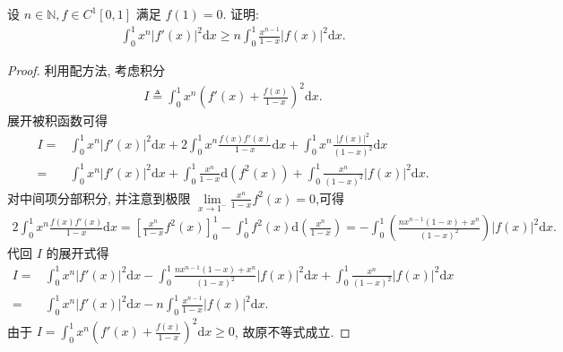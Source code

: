 \documentclass[../../main.tex]{subfiles}%
\begin{document}
\begin{example}
设 \(n \in \mathbb{N}, f \in C^1[0,1]\) 满足 \(f(1) = 0\). 证明:
\begin{align*}
\int_0^1 x^n |f'(x)|^2 \mathrm{d}x \geqslant n \int_0^1 \frac{x^{n-1}}{1-x} |f(x)|^2 \mathrm{d}x.
\end{align*}
\end{example}
\begin{proof}
利用配方法, 考虑积分
\begin{align*}
I \triangleq \int_0^1 x^n \left( f'(x) + \frac{f(x)}{1-x} \right)^2 \mathrm{d}x.
\end{align*}
展开被积函数可得
\begin{align*}
I = & \int_0^1 x^n |f'(x)|^2 \mathrm{d}x + 2 \int_0^1 x^n \frac{f(x)f'(x)}{1-x} \mathrm{d}x + \int_0^1 x^n \frac{|f(x)|^2}{(1-x)^2} \mathrm{d}x \\
= {} & \int_0^1 x^n |f'(x)|^2 \mathrm{d}x + \int_0^1 \frac{x^n}{1-x} \mathrm{d}(f^2(x)) + \int_0^1 \frac{x^n}{(1-x)^2} |f(x)|^2 \mathrm{d}x.
\end{align*}
对中间项分部积分, 并注意到极限 \(\lim\limits_{x \to 1^-} \frac{x^n}{1-x} f^2(x) = 0\),可得
\begin{align*}
2 \int_0^1 x^n \frac{f(x)f'(x)}{1-x} \mathrm{d}x= \left[ \frac{x^n}{1-x} f^2(x) \right]_0^1 - \int_0^1 f^2(x) \mathrm{d}\left( \frac{x^n}{1-x} \right) 
= - \int_0^1 \left( \frac{n x^{n-1}(1-x) + x^n}{(1-x)^2} \right) |f(x)|^2 \mathrm{d}x.
\end{align*}
代回 \(I\) 的展开式得
\begin{align*}
I = {} & \int_0^1 x^n |f'(x)|^2 \mathrm{d}x - \int_0^1 \frac{n x^{n-1}(1-x) + x^n}{(1-x)^2} |f(x)|^2 \mathrm{d}x + \int_0^1 \frac{x^n}{(1-x)^2} |f(x)|^2 \mathrm{d}x \\
= {} & \int_0^1 x^n |f'(x)|^2 \mathrm{d}x - n \int_0^1 \frac{x^{n-1}}{1-x} |f(x)|^2 \mathrm{d}x.
\end{align*}
由于 \(I = \int_0^1 x^n \left( f'(x) + \frac{f(x)}{1-x} \right)^2 \mathrm{d}x \geqslant 0\), 故原不等式成立.
\end{proof}
\end{document}
